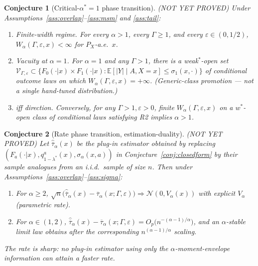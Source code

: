 \documentclass[11pt]{article}
\newcommand{\E}{\mathbb{E}}
\theoremstyle{definition}
\theoremstyle{plain}
\newtheorem{conjecture}{Conjecture}
\theoremstyle{remark}
\begin{document}
\begin{conjecture}[Critical-$\alpha^* = 1$ phase transition] \emph{(NOT YET PROVED)} \label{conj:phase}
Under Assumptions~\ref{ass:overlap}--\ref{ass:msm} and \ref{ass:tail}:
\begin{enumerate}[leftmargin=2em,label=(\roman*)]
  \item \emph{Finite-width regime.} For every $\alpha > 1$, every $\Gamma \ge 1$, and every $\varepsilon \in (0, 1/2)$, $W_\alpha(\Gamma,\varepsilon,x) < \infty$ for $P_X$-a.e.\ $x$.
  \item \emph{Vacuity at $\alpha = 1$.} For $\alpha = 1$ and any $\Gamma > 1$, there is a weak$^*$-open set $\mathcal{V}_{\Gamma,\varepsilon} \subset \{F_0(\cdot|x) \times F_1(\cdot|x) : \E[|Y|\mid A,X=x] \le \sigma_1(x,\cdot)\}$ of conditional outcome laws on which $W_\alpha(\Gamma,\varepsilon,x) = +\infty$. (Generic-class promotion — not a single hand-tuned distribution.)
  \item \emph{iff direction.} Conversely, for any $\Gamma > 1, \varepsilon > 0$, finite $W_\alpha(\Gamma,\varepsilon,x)$ on a $w^*$-open class of conditional laws satisfying R2 implies $\alpha > 1$.
\end{enumerate}
\end{conjecture}

\begin{conjecture}[Rate phase transition, estimation-duality] \emph{(NOT YET PROVED)} \label{conj:rate}
Let $\widehat{\overline{\tau}}_\alpha(x)$ be the plug-in estimator obtained by replacing $(F_a(\cdot|x), q^a_{1-\lambda^*}(x), \sigma_\alpha(x,a))$ in Conjecture~\ref{conj:closedform} by their sample analogues from an i.i.d.\ sample of size $n$. Then under Assumptions~\ref{ass:overlap}--\ref{ass:sigma}:
\begin{enumerate}[leftmargin=2em,label=(\roman*)]
  \item For $\alpha \ge 2$, $\sqrt{n}\bigl(\widehat{\overline{\tau}}_\alpha(x) - \overline{\tau}_\alpha(x;\Gamma,\varepsilon)\bigr) \Rightarrow \mathcal{N}(0, V_\alpha(x))$ with explicit $V_\alpha$ (parametric rate).
  \item For $\alpha \in (1, 2)$, $\widehat{\overline{\tau}}_\alpha(x) - \overline{\tau}_\alpha(x;\Gamma,\varepsilon) = O_p\bigl(n^{-(\alpha-1)/\alpha}\bigr)$, and an $\alpha$-stable limit law obtains after the corresponding $n^{(\alpha-1)/\alpha}$ scaling.
\end{enumerate}
The rate is sharp: no plug-in estimator using only the $\alpha$-moment-envelope information can attain a faster rate.
\end{conjecture}
\end{document}
